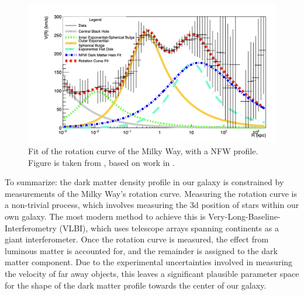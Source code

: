 \begin{figure}
    \centering
    \includegraphics[width=\textwidth]{figures/Felix_rot_curve_fit.png}
    \caption{Fit of the rotation curve of the Milky Way, with a NFW profile. Figure is taken from \cite{FelixThesis}, based on work in \cite{Baushev_2013}.}
    \label{fig:RotationCurveFit}
\end{figure}
To summarize: the dark matter density profile in our galaxy is constrained by measurements of the Milky Way's rotation curve. Measuring the rotation curve is a non-trivial process, which involves measuring the 3d position of stars within our own galaxy. The most modern method to achieve this is Very-Long-Baseline-Interferometry (VLBI), which uses telescope arrays spanning continents as a giant interferometer. Once the rotation curve is measured, the effect from luminous matter is accounted for, and the remainder is assigned to the dark matter component. Due to the experimental uncertainties involved in measuring the velocity of far away objects, this leaves a significant plausible parameter space for the shape of the dark matter profile towards the center of our galaxy. \\

